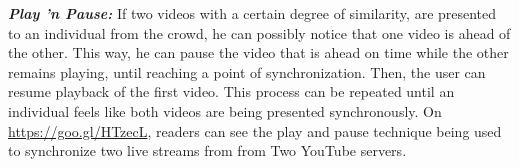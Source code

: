 \textbf{\textit{Play 'n Pause:}} If two videos with a certain degree of similarity, are presented to an individual from the crowd, he can possibly notice that one video is ahead of the other. This way, he can pause the video that is ahead on time while the other remains playing, until reaching a point of synchronization. Then, the user can resume playback of the first video. This process can be repeated until an individual feels like both videos are being presented synchronously. On \url{https://goo.gl/HTzecL}, readers can see the play and pause technique being used to synchronize two live streams from from Two YouTube servers.











